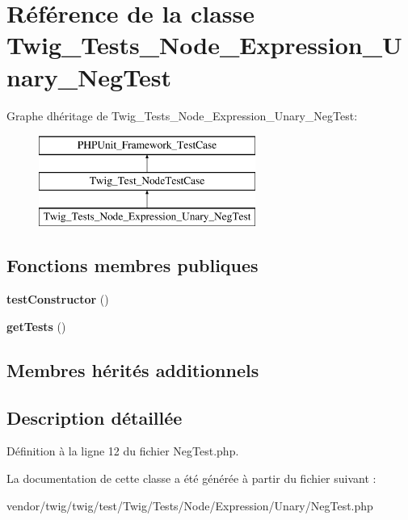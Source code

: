 \hypertarget{class_twig___tests___node___expression___unary___neg_test}{}\section{Référence de la classe Twig\+\_\+\+Tests\+\_\+\+Node\+\_\+\+Expression\+\_\+\+Unary\+\_\+\+Neg\+Test}
\label{class_twig___tests___node___expression___unary___neg_test}
Graphe d\textquotesingle{}héritage de Twig\+\_\+\+Tests\+\_\+\+Node\+\_\+\+Expression\+\_\+\+Unary\+\_\+\+Neg\+Test\+:\begin{figure}[H]
\begin{center}
\leavevmode
\includegraphics[height=3.000000cm]{class_twig___tests___node___expression___unary___neg_test}
\end{center}
\end{figure}
\subsection*{Fonctions membres publiques}
\begin{DoxyCompactItemize}
\item 
{\bfseries test\+Constructor} ()\hypertarget{class_twig___tests___node___expression___unary___neg_test_a47094dc941e72950570900d1418f89c6}{}\label{class_twig___tests___node___expression___unary___neg_test_a47094dc941e72950570900d1418f89c6}

\item 
{\bfseries get\+Tests} ()\hypertarget{class_twig___tests___node___expression___unary___neg_test_a7e247dd31cc8d37a6c97353a062a0080}{}\label{class_twig___tests___node___expression___unary___neg_test_a7e247dd31cc8d37a6c97353a062a0080}

\end{DoxyCompactItemize}
\subsection*{Membres hérités additionnels}


\subsection{Description détaillée}


Définition à la ligne 12 du fichier Neg\+Test.\+php.



La documentation de cette classe a été générée à partir du fichier suivant \+:\begin{DoxyCompactItemize}
\item 
vendor/twig/twig/test/\+Twig/\+Tests/\+Node/\+Expression/\+Unary/Neg\+Test.\+php\end{DoxyCompactItemize}
